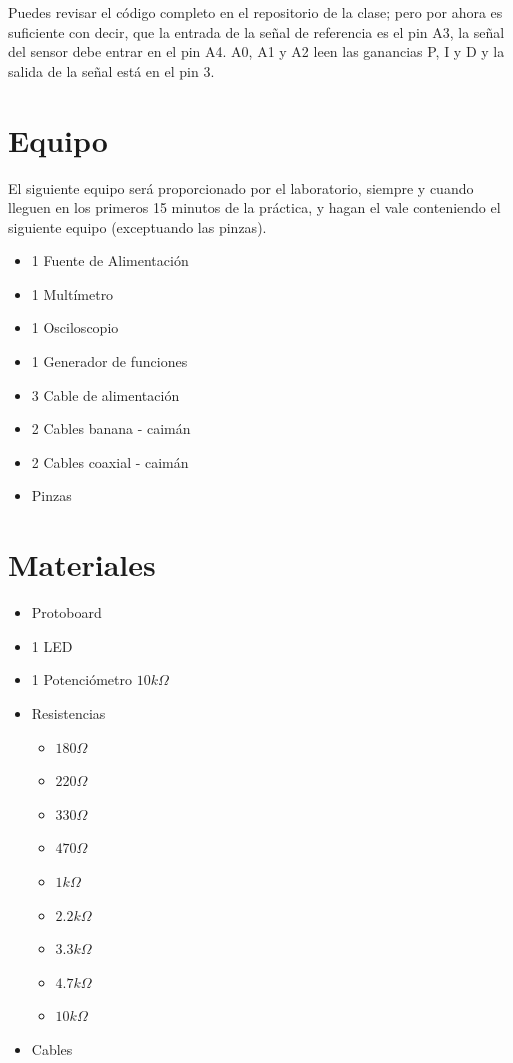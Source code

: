 		Puedes revisar el código completo en el repositorio de la clase; pero por ahora es suficiente con decir, que la entrada de la señal de referencia es el pin A3, la señal del sensor debe entrar en el pin A4. A0, A1 y A2 leen las ganancias P, I y D y la salida de la señal está en el pin 3.

\section{Equipo}

	El siguiente equipo será proporcionado por el laboratorio, siempre y cuando lleguen en los primeros 15 minutos de la práctica, y hagan el vale conteniendo el siguiente equipo (exceptuando las pinzas).

	\begin{itemize}
		\item 1 Fuente de Alimentación
		\item 1 Multímetro
		\item 1 Osciloscopio
		\item 1 Generador de funciones
		\item 3 Cable de alimentación
		\item 2 Cables banana - caimán
		\item 2 Cables coaxial - caimán
		\item Pinzas
	\end{itemize}


\section{Materiales}

	\begin{itemize}
		\item Protoboard
		\item 1 LED
		\item 1 Potenciómetro $10 k\Omega$
		\item Resistencias
		\begin{itemize}
			\item $180 \Omega$
			\item $220 \Omega$
			\item $330 \Omega$
			\item $470 \Omega$
			\item $1 k\Omega$
			\item $2.2 k\Omega$
			\item $3.3 k\Omega$
			\item $4.7 k\Omega$
			\item $10 k\Omega$
		\end{itemize}
		\item Cables
	\end{itemize}

